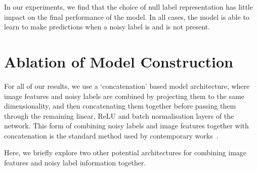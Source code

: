 \documentclass[10pt,twocolumn,letterpaper]{article}
\begin{document}
\begin{table}[ht!]
    \begin{center}
    \end{center}
    \caption{\small Accuracy using different null label methods for Asym. 40\% noise on CIFAR10} 
    \label{tab:null_label_ablation}
\end{table}

In our experiments, we find that the choice of null label representation has little impact on the final performance of the model. In all cases, the model is able to learn to make predictions when a noisy label is and is not present.

\section{Ablation of Model Construction}

For all of our results, we use a `concatenation' based model architecture, where image features and noisy labels are combined by projecting them to the same dimensionality, and then concatenating them together before passing them through the remaining linear, ReLU and batch normalisation layers of the network. This form of combining noisy labels and image features together with concatenation is the standard method used by contemporary works~\cite{gu2021instancedependent,inoue2017multi,veit2017learning}.

Here, we briefly explore two other potential architectures for combining image features and noisy label information together.
\end{document}

